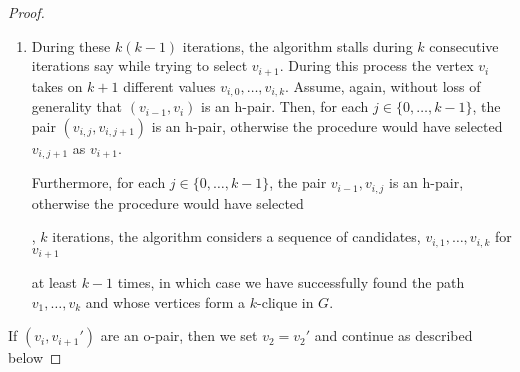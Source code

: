 \documentclass[lotsofwhite]{patmorin}
\begin{document}
\begin{proof}
\begin{enumerate}
     \item During these $k(k-1)$ iterations, the algorithm stalls during
     $k$ consecutive iterations say while trying to select $v_{i+1}$.
     During this process the vertex $v_i$ takes on $k+1$ different
     values $v_{i,0},\ldots,v_{i,k}$.  Assume, again, without loss
     of generality that $(v_{i-1},v_i)$ is an h-pair.  Then, for each
     $j\in\{0,\ldots,k-1\}$, the pair $(v_{i,j}, v_{i,j+1})$ is an h-pair,
     otherwise the procedure would have selected $v_{i,j+1}$ as $v_{i+1}$.

     Furthermore, for each $j\in\{0,\ldots,k-1\}$, the pair $v_{i-1},v_{i,j}$ is an h-pair, otherwise the procedure would have selected 



, $k$ iterations, the algorithm
     considers a sequence of candidates, $v_{i,1},\ldots,v_{i,k}$ for $v_{i+1}$



  at least $k-1$ times, in which case we have
     successfully found the path $v_1,\ldots,v_k$ and whose vertices
     form a $k$-clique in $G$.
  \end{enumerate}


  If $(v_i,v_{i+1}')$ are an o-pair, then we set $v_2=v_2'$ and continue
  as described below




\end{proof}
\end{document}
